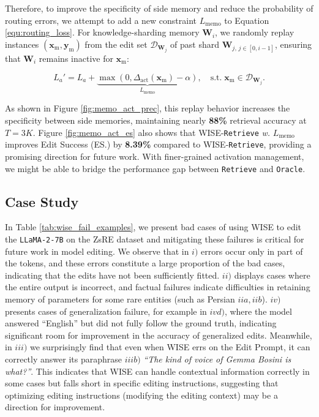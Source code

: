 Therefore, to improve the specificity of side memory and reduce the probability of routing errors, we attempt to add a new constraint $L_{\text{memo}}$ to Equation \ref{equ:routing_loss}.
For knowledge-sharding memory $\mathbf{W}_i$, we randomly replay instances $(\mathbf{x}_{\mathrm{m}}, \mathbf{y}_{\mathrm{m}})$ from the edit set $\mathcal{D}_{\mathbf{W}_j}$ of past shard $\mathbf{W}_{j, \, j \in [0, i-1]}$, ensuring that $\mathbf{W}_i$ remains inactive for $\mathbf{x}_{\mathrm{m}}$:

$$L_a' = L_a + \underbrace{\max(0, \Delta_{\text{act}}(\mathbf{x}_{\mathrm{m}}) - \alpha)}_{L_\text{memo}}, \quad \text{s.t.}\; \mathbf{x}_{\mathrm{m}} \in \mathcal{D}_{\mathbf{W}_j}.$$

As shown in Figure \ref{fig:memo_act_prec}, this replay behavior increases the specificity between side memories, maintaining nearly \textbf{88\%} retrieval accuracy at $T=3K$. 
Figure \ref{fig:memo_act_es} also shows that WISE-\texttt{Retrieve} \textit{w.} $L_{\text{memo}}$ improves Edit Success (ES.) by \textbf{8.39\%} compared to WISE-\texttt{Retrieve}, providing a promising direction for future work.
With finer-grained activation management, we might be able to bridge the performance gap between \texttt{Retrieve} and \texttt{Oracle}.

\subsection{Case Study}


In Table \ref{tab:wise_fail_examples}, we present bad cases of using WISE to edit the \texttt{LLaMA-2-7B} on the ZsRE dataset and mitigating these failures is critical for future work in model editing.
We observe that in $i)$ errors occur only in part of the tokens, and these errors constitute a large proportion of the bad cases, indicating that the edits have not been sufficiently fitted.
$ii)$ displays cases where the entire output is incorrect, and factual failures indicate difficulties in retaining memory of parameters for some rare entities (such as Persian $iia, iib$).
$iv)$ presents cases of generalization failure, for example in $ivd)$, where the model answered ``English'' but did not fully follow the ground truth, indicating significant room for improvement in the accuracy of generalized edits.
Meanwhile, in $iii)$ we surprisingly find that even when WISE errs on the Edit Prompt, it can correctly answer its paraphrase $iii b)$ \textit{``The kind of voice of Gemma Bosini is what?''}.
This indicates that WISE can handle contextual information correctly in some cases but falls short in specific editing instructions, suggesting that optimizing editing instructions (modifying the editing context) may be a direction for improvement.


